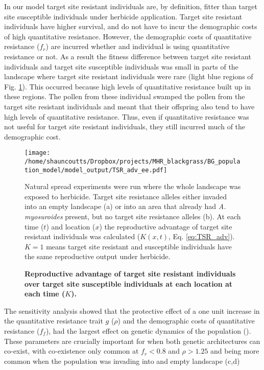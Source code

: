 \documentclass[10pt,letterpaper]{article}
\begin{document}
In our model target site resistant individuals are, by definition, fitter than target site susceptible individuals under herbicide application. Target site resistant individuals have higher survival, and do not have to incur the demographic costs of high quantitative resistance. However, the demographic costs of quantitative resistance ($f_r$) are incurred whether and individual is using quantitative resistance or not. As a result the fitness difference between target site resistant individuals and target site susceptible individuals was small in parts of the landscape where target site resistant individuals were rare (light blue regions of Fig. \ref{fig:TSR_adv}). This occurred because high levels of quantitative resistance built up in these regions. The pollen from these individual swamped the pollen from the target site resistant individuals and meant that their offspring also tend to have high levels of quantitative resistance. Thus, even if quantitative resistance was not useful for target site resistant individuals, they still incurred much of the demographic cost.

\begin{figure}[!h] 
	\texttt{[image: /home/shauncoutts/Dropbox/projects/MHR\_blackgrass/BG\_population\_model/model\_output/TSR\_adv\_ee.pdf]}
\caption{\bf Reproductive advantage of target site resistant individuals over target site susceptible individuals at each location at each time ($K$).} Natural spread experiments were run where the whole landscape was exposed to herbicide. Target site resistance alleles either invaded into an empty landscape (a) or into an area that already had \textit{A. myosuroides} present, but no target site resistance alleles (b). At each time ($t$) and location ($x$) the reproductive advantage of target site resistant individuals was calculated ($K(x, t)$, Eq. \ref{eq:TSR_adv}). $K = 1$ means  target site resistant and susceptible individuals have the same reproductive output under herbicide.   
\label{fig:TSR_adv}
\end{figure}

The sensitivity analysis showed that the protective effect of a one unit increase in the quantitative resistance trait $g$ ($\rho$) and the demographic costs of quantitative resistance ($f_f$), had the largest effect on genetic dynamics of the population (). These parameters are crucially important for when both genetic architectures can co-exist, with co-existence only common at $f_r < 0.8$ and $\rho > 1.25$ and being more common when the  population was invading into and empty landscape (c,d)   
\end{document}
